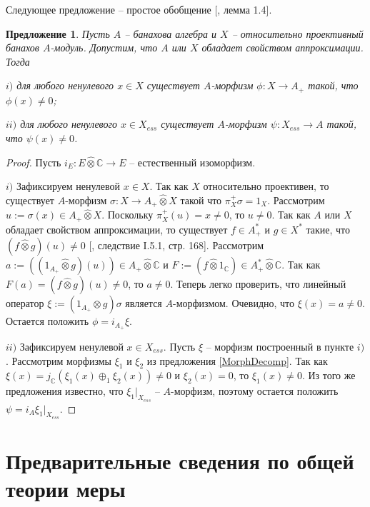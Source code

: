 \documentclass[12pt]{article}
\newtheorem{proposition}[theorem]{Предложение}
\newcommand{\projtens}{\mathbin{\widehat{\otimes}}}
\begin{document}
Следующее предложение -- простое обобщение [\cite{SelivBiprojBanAlg}, лемма 1.4].

\begin{proposition}\label{RelProjNecesCond} Пусть $A$ -- банахова алгебра и $X$ -- относительно проективный банахов $A$-модуль. Допустим, что $A$ или $X$ обладает свойством аппроксимации. Тогда

    $i)$ для любого ненулевого $x\in X$ существует $A$-морфизм $\phi:X\to A_+$ такой, что $\phi(x)\neq 0$;

    $ii)$ для любого ненулевого $x\in X_{ess}$ существует $A$-морфизм $\psi:X_{ess}\to A$ такой, что $\psi(x)\neq 0$.
\end{proposition}
\begin{proof} Пусть $i_E:E\projtens \mathbb{C}\to E$ -- естественный изоморфизм.

    $i)$ Зафиксируем ненулевой $x\in X$. Так как $X$ относительно проективен, то существует $A$-морфизм $\sigma:X\to A_+\projtens X$ такой что $\pi_X^+\sigma=1_X$. Рассмотрим $u:=\sigma(x)\in A_+\projtens X$. Поскольку $\pi_X^+(u)=x\neq 0$, то $u\neq 0$. Так как $A$ или $X$ обладает свойством аппроксимации, то существует $f\in A_+^*$ и $g\in X^*$ такие, что $(f\projtens g)(u)\neq 0$ [\cite{GrothProdTenTopNucl}, следствие I.5.1, стр. 168]. Рассмотрим $a:=((1_{A_+}\projtens g)(u))\in A_+\projtens\mathbb{C}$ и $F:=(f\projtens 1_{\mathbb{C}})\in A_+^*\projtens\mathbb{C}$. Так как $F(a)=(f\projtens g)(u)\neq 0$, то $a\neq 0$. Теперь легко проверить, что линейный оператор $\xi:=(1_{A_+}\projtens g)\sigma$ является $A$-морфизмом. Очевидно, что $\xi(x)=a\neq 0$. Остается положить $\phi=i_{A_+}\xi$.

    $ii)$ Зафиксируем ненулевой $x\in X_{ess}$. Пусть $\xi$ -- морфизм построенный в пункте $i)$. Рассмотрим морфизмы $\xi_1$ и $\xi_2$ из предложения \ref{MorphDecomp}. Так как $\xi(x)=j_{\mathbb{C}}(\xi_1(x)\oplus_1\xi_2(x))\neq 0$ и $\xi_2(x)=0$, то $\xi_1(x)\neq 0$. Из того же предложения известно, что $\xi_1|_{X_{ess}}$ -- $A$-морфизм, поэтому остается положить $\psi=i_A \xi_1|_{X_{ess}}$.

\end{proof}


\section{Предварительные сведения по общей теории меры}
\label{SectionPreliminariesOnGeneralMeasureTheory}
\end{document}
